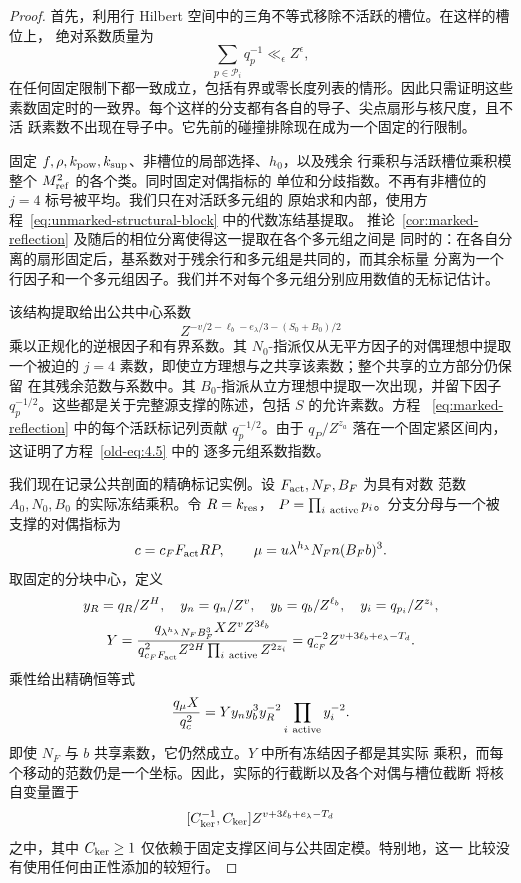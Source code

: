 \documentclass[11pt,a4paper]{article}
\numberwithin{equation}{section}
\numberwithin{figure}{section}
\theoremstyle{definition}
\theoremstyle{remark}
\begin{document}
\begin{proof}
首先，利用行 Hilbert 空间中的三角不等式移除不活跃的槽位。在这样的槽位上，
绝对系数质量为
\[
 \sum_{p\in\mathcal P_i}q_p^{-1}\ll_\epsilon Z^\epsilon,
\]
在任何固定限制下都一致成立，包括有界或零长度列表的情形。因此只需证明这些
素数固定时的一致界。每个这样的分支都有各自的导子、尖点扇形与核尺度，且不活
跃素数不出现在导子中。它先前的碰撞排除现在成为一个固定的行限制。

固定 \(f,\rho,k_{\rm pow},k_{\rm sup}\)、非槽位的局部选择、\(h_0\)，以及残余
行乘积与活跃槽位乘积模整个 \(M_{\rm ref}^2\) 的各个类。同时固定对偶指标的
单位和分歧指数。不再有非槽位的 \(j=4\) 标号被平均。我们只在对活跃多元组的
原始求和内部，使用方程~\eqref{eq:unmarked-structural-block} 中的代数冻结基提取。
推论~\ref{cor:marked-reflection} 及随后的相位分离使得这一提取在各个多元组之间是
同时的：在各自分离的扇形固定后，基系数对于残余行和多元组是共同的，而其余标量
分离为一个行因子和一个多元组因子。我们并不对每个多元组分别应用数值的无标记估计。

该结构提取给出公共中心系数
\[
 Z^{-v/2-\ell_b-e_\lambda/3-(S_0+B_0)/2}
\]
乘以正规化的逆根因子和有界系数。其 \(N_0\)-指派仅从无平方因子的对偶理想中提取
一个被迫的 \(j=4\) 素数，即使立方理想与之共享该素数；整个共享的立方部分仍保留
在其残余范数与系数中。其 \(B_0\)-指派从立方理想中提取一次出现，并留下因子
\(q_p^{-1/2}\)。这些都是关于完整源支撑的陈述，包括 \(S\) 的允许素数。方程
~\eqref{eq:marked-reflection} 中的每个活跃标记列贡献 \(q_p^{-1/2}\)。由于
\(q_P/Z^{z_a}\) 落在一个固定紧区间内，这证明了方程~\eqref{old-eq:4.5} 中的
逐多元组系数指数。

我们现在记录公共剖面的精确标记实例。设 \(F_{\rm act},N_F,B_F\) 为具有对数
范数 \(A_0,N_0,B_0\) 的实际冻结乘积。令 \(R=k_{\rm res}\)，
\(P=\prod_{i\ {\rm active}}p_i\)。分支分母与一个被支撑的对偶指标为
\[
 c=c_FF_{\rm act}RP,\qquad
 \mu=u\lambda^{h_\lambda}N_Fn(B_Fb)^3.
\]
取固定的分块中心，定义
\[
 \begin{gathered}
 y_R=q_R/Z^H,\quad y_n=q_n/Z^v,\quad
 y_b=q_b/Z^{\ell_b},\quad y_i=q_{p_i}/Z^{z_i},\\
 Y=\frac{q_{\lambda^{h_\lambda}N_FB_F^3}X Z^vZ^{3\ell_b}}
          {q_{c_FF_{\rm act}}^2Z^{2H}\prod_{i\ {\rm active}}Z^{2z_i}}
   =q_{c_F}^{-2}Z^{v+3\ell_b+e_\lambda-T_d}.
 \end{gathered}
\]
乘性给出精确恒等式
\begin{equation}\label{eq:reflection-actual-annuli}
 \frac{q_\mu X}{q_c^2}
       =Yy_ny_b^3y_R^{-2}\prod_{i\ {\rm active}}y_i^{-2}.
\end{equation}
即使 \(N_F\) 与 \(b\) 共享素数，它仍然成立。\(Y\) 中所有冻结因子都是其实际
乘积，而每个移动的范数仍是一个坐标。因此，实际的行截断以及各个对偶与槽位截断
将核自变量置于
\[
 [C_{\rm ker}^{-1},C_{\rm ker}]
       Z^{v+3\ell_b+e_\lambda-T_d}
\]
之中，其中 \(C_{\rm ker}\ge1\) 仅依赖于固定支撑区间与公共固定模。特别地，这一
比较没有使用任何由正性添加的较短行。


\end{proof}
\end{document}
